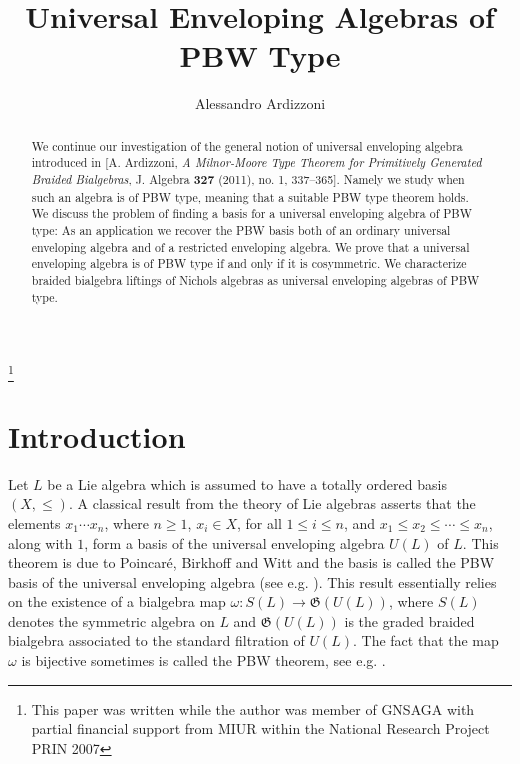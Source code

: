 \documentclass[english]{amsart}
\numberwithin{equation}{section}
\numberwithin{figure}{section}
\theoremstyle{plain}
\theoremstyle{definition}
\theoremstyle{definition}
\theoremstyle{remark}
\theoremstyle{remark}
\theoremstyle{plain}
\theoremstyle{plain}
\theoremstyle{plain}
\begin{document}
\title{Universal Enveloping Algebras of PBW Type}


\author{Alessandro Ardizzoni}










\thanks{This paper was written while the author was member of GNSAGA with
partial financial support from MIUR within the National Research Project
PRIN 2007}

\begin{abstract}
We continue our investigation of the general notion of universal enveloping
algebra introduced in [A. Ardizzoni, \emph{A Milnor-Moore
Type Theorem for Primitively Generated Braided Bialgebras}, J. Algebra \textbf{327} (2011), no. 1, 337--365]. Namely we study when such an algebra is of PBW type, meaning that a suitable PBW type
theorem holds. We discuss the problem of finding a basis for a universal enveloping
algebra of PBW type: As an application we recover  the PBW basis both
of an ordinary universal enveloping algebra and of a restricted enveloping
algebra. We prove that a universal enveloping algebra is of PBW type if and only if it is cosymmetric. We characterize braided bialgebra liftings
of Nichols algebras as universal enveloping algebras of PBW type.
\end{abstract}


\maketitle
\tableofcontents


\section{Introduction}

Let $L$ be a Lie algebra which is assumed to have a totally ordered
basis $(X,\leq)$. A classical result from the theory of Lie algebras
asserts that the elements $x_{1}\cdots x_{n}$, where $n\geq1$, $x_{i}\in X$,
for all $1\leq i\leq n$, and $x_{1}\leq x_{2}\leq\cdots\leq x_{n}$,
along with $1$, form a basis of the universal enveloping algebra
$U(L)$ of $L$. This theorem is due to Poincaré, Birkhoff and Witt
and the basis is called the PBW basis of the universal enveloping
algebra (see e.g. \cite[Corollary C, page 92]{Humphreys}). This result
essentially relies on the existence of a bialgebra map $\omega:S\left(L\right)\rightarrow\mathfrak{G}\left(U(L)\right)$,
where $S(L)$ denotes the symmetric algebra on $L$ and $\mathfrak{G}\left(U(L)\right)$
is the graded braided bialgebra associated to the standard filtration of $U(L)$.
The fact that the map $\omega$ is bijective sometimes is called the
PBW theorem, see e.g. \cite[Corollary C, page 92]{Humphreys}.
\end{document}
